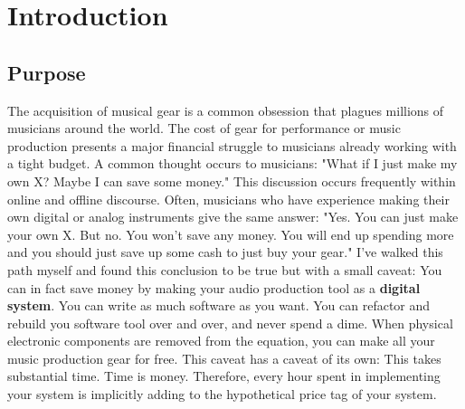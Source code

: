 \documentclass[acmlarge,screen]{acmart}
\begin{document}

\maketitle

\section{Introduction}
\subsection{Purpose}
	The acquisition of musical gear is a common obsession that plagues millions of musicians around the world. The cost of gear for performance or music production presents a major financial struggle to musicians already working with a tight budget. A common thought occurs to musicians: "What if I just make my own X? Maybe I can save some money." This discussion occurs frequently within online and offline discourse. Often, musicians who have experience making their own digital or analog instruments give the same answer: "Yes. You can just make your own X. But no. You won't save any money. You will end up spending more and you should just save up some cash to just buy your gear." I've walked this path myself and found this conclusion to be true but with a small caveat: You can in fact save money by making your audio production tool as a \textbf{digital system}. You can write as much software as you want. You can refactor and rebuild you software tool over and over, and never spend a dime. When physical electronic components are removed from the equation, you can make all your music production gear for free. This caveat has a caveat of its own: This takes substantial time. Time is money. Therefore, every hour spent in implementing your system is implicitly adding to the hypothetical price tag of your system.
	
\end{document}
